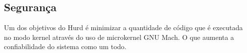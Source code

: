 \documentclass[conference]{IEEEtran}
\begin{document}
\subsection{Segurança}\label{sec:HurdSec}
Um dos objetivos do Hurd é minimizar a quantidade de código que é executada no modo kernel através do uso de microkernel GNU Mach. O que aumenta a confiabilidade do sistema como um todo.



\end{document}
